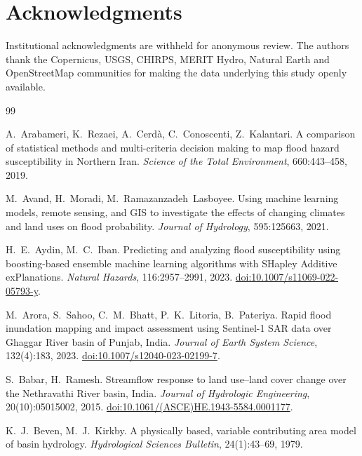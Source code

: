 \documentclass[11pt,a4paper]{article}
\begin{document}
\section*{Acknowledgments}
Institutional acknowledgments are withheld for anonymous review. The authors
thank the Copernicus, USGS, CHIRPS, MERIT Hydro, Natural Earth and OpenStreetMap
communities for making the data underlying this study openly available.


\begin{thebibliography}{99}
\setlength{\itemsep}{1pt}

A.~Arabameri, K.~Rezaei, A.~Cerd\`a, C.~Conoscenti, Z.~Kalantari.
A comparison of statistical methods and multi-criteria decision making to map
flood hazard susceptibility in Northern Iran.
\emph{Science of the Total Environment}, 660:443--458, 2019.

M.~Avand, H.~Moradi, M.~Ramazanzadeh~Lasboyee.
Using machine learning models, remote sensing, and GIS to investigate the effects
of changing climates and land uses on flood probability.
\emph{Journal of Hydrology}, 595:125663, 2021.

H.~E.~Aydin, M.~C.~Iban.
Predicting and analyzing flood susceptibility using boosting-based ensemble
machine learning algorithms with SHapley Additive exPlanations.
\emph{Natural Hazards}, 116:2957--2991, 2023.
\href{https://doi.org/10.1007/s11069-022-05793-y}{doi:10.1007/s11069-022-05793-y}.

M.~Arora, S.~Sahoo, C.~M.~Bhatt, P.~K.~Litoria, B.~Pateriya.
Rapid flood inundation mapping and impact assessment using Sentinel-1 SAR data
over Ghaggar River basin of Punjab, India.
\emph{Journal of Earth System Science}, 132(4):183, 2023.
\href{https://doi.org/10.1007/s12040-023-02199-7}{doi:10.1007/s12040-023-02199-7}.

S.~Babar, H.~Ramesh.
Streamflow response to land use--land cover change over the Nethravathi River
basin, India.
\emph{Journal of Hydrologic Engineering}, 20(10):05015002, 2015.
\href{https://doi.org/10.1061/(ASCE)HE.1943-5584.0001177}{doi:10.1061/(ASCE)HE.1943-5584.0001177}.

K.~J.~Beven, M.~J.~Kirkby.
A physically based, variable contributing area model of basin hydrology.
\emph{Hydrological Sciences Bulletin}, 24(1):43--69, 1979.


\end{thebibliography}
\end{document}
